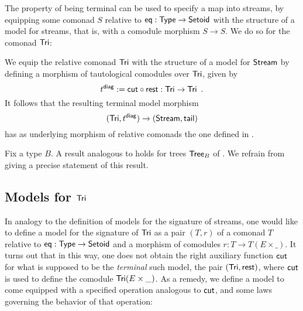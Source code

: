 \documentclass[a4paper,USenglish]{lipics}
\begin{document}
The property of being terminal can be used to specify a map into streams, by equipping some comonad $S$ relative to $\mathsf{eq}:\mathsf{Type}\to\mathsf{Setoid}$
with the structure of a model for streams, that is, with a comodule morphism $S\to S$.
We do so for the comonad $\mathsf{Tri}$:

\begin{ex}
  We equip the relative comonad $\mathsf{Tri}$ with the structure of a model for $\mathsf{Stream}$ by defining a 
  morphism of tautological comodules over $\mathsf{Tri}$, given by
   \[ t^{\mathsf{diag}} := {\mathsf{cut}} \circ {\ensuremath{\mathsf{rest}}}  : \mathsf{Tri} \to \mathsf{Tri} \enspace . \]
  It follows that the resulting terminal model morphism
   \[(\mathsf{Tri}, t^{\mathsf{diag}}) \to (\mathsf{Stream}, \mathsf{tail})\] has as underlying morphism of relative comonads the one defined in .
\end{ex}

\begin{Long}
 
\begin{rem}
 Fix a type $B$. A result analogous to  holds for trees $\mathsf{Tree}_B$ of . 
 We refrain from giving a precise statement of this result.
\end{rem}

\end{Long}

\begin{Long}
\subsection{Models for $\mathsf{Tri}$}
\end{Long}

In analogy to the definition of models for the signature of streams, one would like to define
a model for the signature of $\mathsf{Tri}$ as a pair $(T,r)$ of a comonad $T$ relative to $\mathsf{eq} : \mathsf{Type} \to \mathsf{Setoid}$ and 
a morphism of comodules $r : T \to T(E\times \_)$. 
It turns out that in this way, one does not obtain the right auxiliary function $\mathsf{cut}$ for what is
supposed to be the \emph{terminal} such model, the pair $(\mathsf{Tri},\mathsf{rest})$, where $\mathsf{cut}$ is used to define the comodule $\mathsf{Tri}(E\times \_)$.
As a remedy, we define a model to come equipped with a specified operation analogous to $\mathsf{cut}$, and some laws governing
the behavior of that operation:
\end{document}
